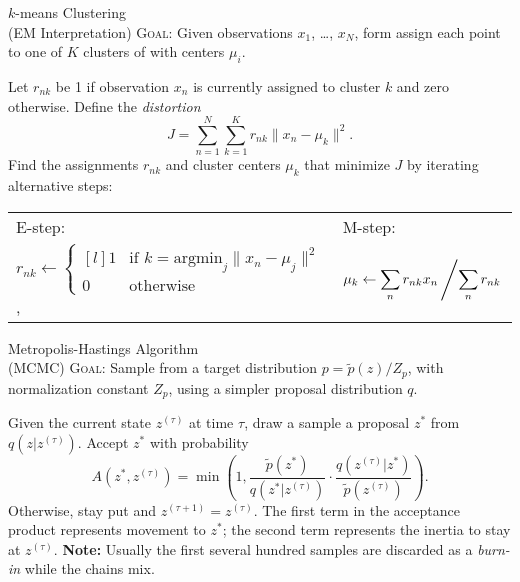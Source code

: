 \documentclass[avery5388, grid]{flashcards}
\begin{document}
\makeatletter
\renewcommand*\env@matrix[1][c]{\hskip -\arraycolsep
  \let\@ifnextchar\new@ifnextchar
  \array{*\c@MaxMatrixCols #1}}
\makeatother


\begin{flashcard}{$k$-means Clustering\\ (EM Interpretation)}
\textsc{Goal:} Given observations $x_1$, \dots, $x_N$, form assign each point to one of $K$ clusters of with centers $\mu_i$.
\begin{flushleft}
Let $r_{nk}$ be 1 if observation $x_n$ is currently assigned to cluster $k$ and zero otherwise. Define the \emph{distortion}
$$J = \sum_{n=1}^N\sum_{k=1}^K r_{nk}\| x_n - \mu_k\| ^2.$$
Find the assignments $r_{nk}$ and cluster centers $\mu_k$ that minimize $J$ by iterating alternative steps:\\
\vskip 3pt
\begin{tabular}{l l}
\textsf{E-step:} & \textsf{M-step:}\\
$r_{nk} \gets \left\{\begin{matrix}[l] 1 &  \text{if } k=\mathrm{argmin}_j \| x_n-\mu_j \|^2\\ 0 & \text{otherwise}\end{matrix}\right.$,
& $\mu_k \gets \displaystyle\sum_n r_{nk} x_n\left/\displaystyle\sum_n r_{nk}\right.$
\end{tabular}
\end{flushleft}
\end{flashcard}

\begin{flashcard}{Metropolis-Hastings Algorithm\\(MCMC)}
\textsc{Goal:} Sample from a target distribution $p=\tilde{p}(z)/Z_p$, with normalization constant $Z_p$, using a simpler proposal distribution $q$.
\begin{flushleft}
Given the current state $z^{(\tau)}$ at time $\tau$, draw a sample a proposal $z^*$ from $q(z|z^{(\tau)})$. Accept $z^*$ with probability 
$$A(z^*, z^{(\tau)}) = \min\left(1, \frac{\tilde{p}(z^*)}{q(z^*|z^{(\tau)})}\cdot \frac{q(z^{(\tau)}|z^*)}{\tilde{p}(z^{(\tau)})}\right).$$
Otherwise, stay put and $z^{(\tau+1)}=z^{(\tau)}.$
\vskip 5pt
The first term in the acceptance product represents movement to $z^*$; the second term represents the inertia to stay at $z^{(\tau)}$.
\vskip 5pt
\textsf{\textbf{Note:}} Usually the first several hundred samples are discarded as a \emph{burn-in} while the chains mix.
\end{flushleft}
\end{flashcard}
\end{document}
